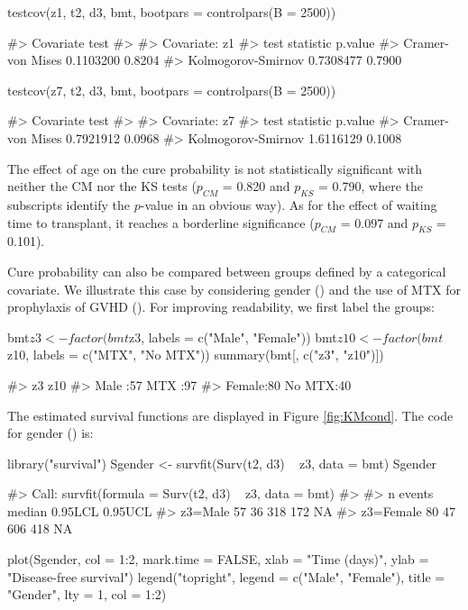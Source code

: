\begin{example}
testcov(z1, t2, d3, bmt,  bootpars = controlpars(B = 2500))
\end{example}
\begin{example}
#> Covariate test 
#>
#> Covariate:  z1 
#>               test statistic p.value
#>   Cramer-von Mises 0.1103200  0.8204
#> Kolmogorov-Smirnov 0.7308477  0.7900
\end{example}


\begin{example}
testcov(z7, t2, d3, bmt,  bootpars = controlpars(B = 2500))
\end{example}
\begin{example}
#> Covariate test 
#>
#> Covariate:  z7 
#>               test statistic p.value
#>   Cramer-von Mises 0.7921912  0.0968
#> Kolmogorov-Smirnov 1.6116129  0.1008
\end{example}

The effect of age on the cure probability is not statistically significant with neither the CM nor the KS tests ($p_{CM}$ = 0.820 and $p_{KS}$ = 0.790, where the subscripts identify the $p$-value in an obvious way). As for the effect of waiting time to transplant, it reaches a borderline significance ($p_{CM}$ = 0.097 and $p_{KS}$ = 0.101).

Cure probability can also be compared between groups defined by a categorical covariate. We illustrate this case by considering gender () and the use of MTX for prophylaxis of GVHD (). For improving readability, we first label the groups:

\begin{example}
bmt$z3 <- factor(bmt$z3, labels = c("Male", "Female"))
bmt$z10 <- factor(bmt$z10, labels = c("MTX", "No MTX"))
summary(bmt[, c("z3", "z10")]) 
\end{example}
\begin{example}
#>      z3         z10    
#> Male  :57   MTX   :97  
#> Female:80   No MTX:40  
\end{example}

The estimated survival functions are displayed in Figure \ref{fig:KMcond}. The code for gender () is:

\begin{example}
library("survival")
Sgender <- survfit(Surv(t2, d3) ~ z3, data = bmt)
Sgender
\end{example}
\begin{example}
#> Call: survfit(formula = Surv(t2, d3) ~ z3, data = bmt)
#>
#>           n events median 0.95LCL 0.95UCL
#> z3=Male   57     36    318     172      NA
#> z3=Female 80     47    606     418      NA
\end{example}
\begin{example}
plot(Sgender, col = 1:2, mark.time = FALSE, xlab = "Time (days)",
   ylab = "Disease-free survival")
legend("topright", legend = c("Male", "Female"), title = "Gender",
   lty = 1, col = 1:2)
\end{example}



